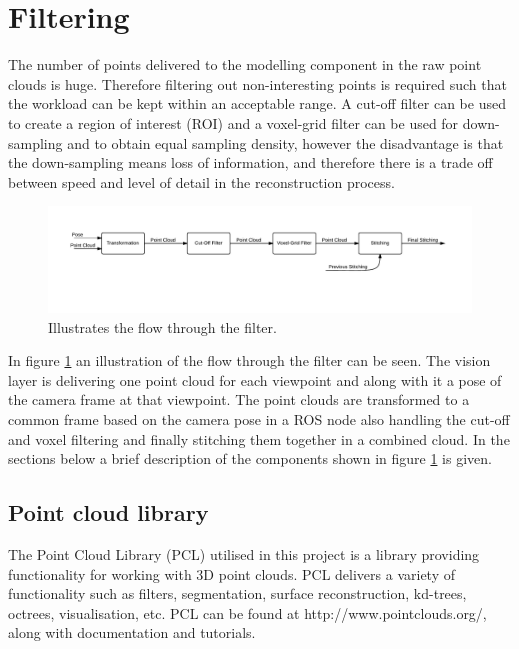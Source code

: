 \section{Filtering}

The number of points delivered to the modelling component in the raw point clouds is huge. Therefore filtering out non-interesting points is required such that the workload can be kept within an acceptable range. A cut-off filter can be used to create a region of interest (ROI) and a voxel-grid filter can be used for down-sampling and to obtain equal sampling density, however the disadvantage is that the down-sampling means loss of information, and therefore there is a trade off between speed and level of detail in the reconstruction process.  

\begin{figure}[htb]
	\begin{center}
		\includegraphics[scale=0.6,trim=20 70 0 20]{graphics/07_modelling/FilterFlow.pdf}%
		\caption{Illustrates the flow through the filter.}
		\label{fig:filter_flow}
	\end{center}
\end{figure}

In figure \ref{fig:filter_flow} an illustration of the flow through the filter can be seen. The vision layer is delivering one point cloud for each viewpoint and along with it a pose of the camera frame at that viewpoint. The point clouds are transformed to a common frame based on the camera pose in a ROS node also handling the cut-off and voxel filtering and finally stitching them together in a combined cloud. In the sections below a brief description of the components shown in figure \ref{fig:filter_flow} is given. 

\subsection{Point cloud library}
The Point Cloud Library (PCL) utilised in this project is a library providing functionality for working with 3D point clouds. PCL delivers a variety of functionality such as filters, segmentation, surface reconstruction, kd-trees, octrees, visualisation, etc. PCL can be found at http://www.pointclouds.org/, along with documentation and tutorials.

